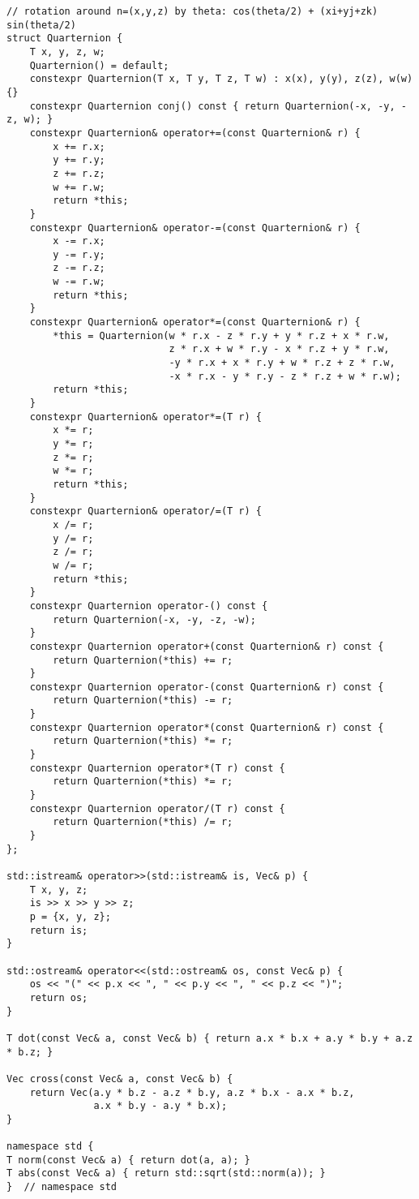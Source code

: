 \begin{lstlisting}
// rotation around n=(x,y,z) by theta: cos(theta/2) + (xi+yj+zk) sin(theta/2)
struct Quarternion {
    T x, y, z, w;
    Quarternion() = default;
    constexpr Quarternion(T x, T y, T z, T w) : x(x), y(y), z(z), w(w) {}
    constexpr Quarternion conj() const { return Quarternion(-x, -y, -z, w); }
    constexpr Quarternion& operator+=(const Quarternion& r) {
        x += r.x;
        y += r.y;
        z += r.z;
        w += r.w;
        return *this;
    }
    constexpr Quarternion& operator-=(const Quarternion& r) {
        x -= r.x;
        y -= r.y;
        z -= r.z;
        w -= r.w;
        return *this;
    }
    constexpr Quarternion& operator*=(const Quarternion& r) {
        *this = Quarternion(w * r.x - z * r.y + y * r.z + x * r.w,
                            z * r.x + w * r.y - x * r.z + y * r.w,
                            -y * r.x + x * r.y + w * r.z + z * r.w,
                            -x * r.x - y * r.y - z * r.z + w * r.w);
        return *this;
    }
    constexpr Quarternion& operator*=(T r) {
        x *= r;
        y *= r;
        z *= r;
        w *= r;
        return *this;
    }
    constexpr Quarternion& operator/=(T r) {
        x /= r;
        y /= r;
        z /= r;
        w /= r;
        return *this;
    }
    constexpr Quarternion operator-() const {
        return Quarternion(-x, -y, -z, -w);
    }
    constexpr Quarternion operator+(const Quarternion& r) const {
        return Quarternion(*this) += r;
    }
    constexpr Quarternion operator-(const Quarternion& r) const {
        return Quarternion(*this) -= r;
    }
    constexpr Quarternion operator*(const Quarternion& r) const {
        return Quarternion(*this) *= r;
    }
    constexpr Quarternion operator*(T r) const {
        return Quarternion(*this) *= r;
    }
    constexpr Quarternion operator/(T r) const {
        return Quarternion(*this) /= r;
    }
};

std::istream& operator>>(std::istream& is, Vec& p) {
    T x, y, z;
    is >> x >> y >> z;
    p = {x, y, z};
    return is;
}

std::ostream& operator<<(std::ostream& os, const Vec& p) {
    os << "(" << p.x << ", " << p.y << ", " << p.z << ")";
    return os;
}

T dot(const Vec& a, const Vec& b) { return a.x * b.x + a.y * b.y + a.z * b.z; }

Vec cross(const Vec& a, const Vec& b) {
    return Vec(a.y * b.z - a.z * b.y, a.z * b.x - a.x * b.z,
               a.x * b.y - a.y * b.x);
}

namespace std {
T norm(const Vec& a) { return dot(a, a); }
T abs(const Vec& a) { return std::sqrt(std::norm(a)); }
}  // namespace std


\end{lstlisting}
